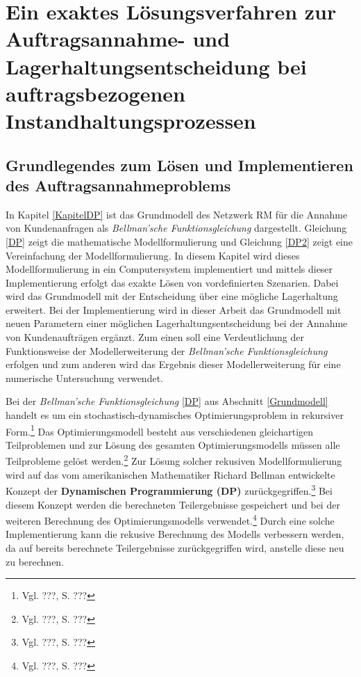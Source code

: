 \chapter{Ein exaktes Lösungsverfahren zur Auftragsannahme- und Lagerhaltungsentscheidung bei auftragsbezogenen Instandhaltungsprozessen}
\setcounter{footnote}{7}

\section{Grundlegendes zum Lösen und Implementieren des Auftragsannahmeproblems}

In Kapitel \ref{KapitelDP} ist das Grundmodell des Netzwerk RM für die Annahme von Kundenanfragen als \textit{Bellman'sche Funktionsgleichung} dargestellt. Gleichung \eqref{DP} zeigt die mathematische Modellformulierung und Gleichung \eqref{DP2} zeigt eine Vereinfachung der Modellformulierung. In diesem Kapitel wird dieses Modellformulierung in ein Computersystem implementiert und mittels dieser Implementierung erfolgt das exakte Lösen von vordefinierten Szenarien. Dabei wird das Grundmodell mit der Entscheidung über eine mögliche Lagerhaltung erweitert. Bei der Implementierung wird in dieser Arbeit das Grundmodell mit neuen Parametern einer möglichen Lagerhaltungsentscheidung bei der Annahme von Kundenaufträgen ergänzt. Zum einen soll eine Verdeutlichung der Funktionsweise der Modellerweiterung der \textit{Bellman'sche Funktionsgleichung} erfolgen und zum anderen wird das Ergebnis dieser Modellerweiterung für eine numerische Untersuchung verwendet.

Bei der \textit{Bellman'sche Funktionsgleichung} \eqref{DP} aus Abschnitt \ref{Grundmodell} handelt es um ein stochastisch-dynamisches Optimierungsproblem in rekursiver Form.\footnote{Vgl. ???, S. ???} Das Optimierungsmodell besteht aus verschiedenen gleichartigen Teilproblemen und zur Lösung des gesamten Optimierungsmodells müssen alle Teilprobleme gelöst werden.\footnote{Vgl. ???, S. ???} Zur Lösung solcher rekusiven Modellformulierung wird auf das vom amerikanischen Mathematiker Richard Bellman entwickelte Konzept der \textbf{Dynamischen Programmierung (DP)} zurückgegriffen.\footnote{Vgl. ???, S. ???} Bei diesem Konzept werden die berechneten Teilergebnisse gespeichert und bei der weiteren Berechnung des Optimierungsmodells verwendet.\footnote{Vgl. ???, S. ???} Durch eine solche Implementierung kann die rekusive Berechnung des Modells verbessern werden, da auf bereits berechnete Teilergebnisse zurückgegriffen wird, anstelle diese neu zu berechnen.

